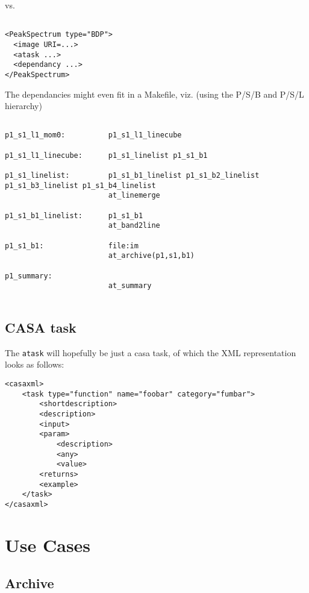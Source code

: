 \documentclass{report}
\begin{document}
vs.

\footnotesize
\begin{verbatim}

<PeakSpectrum type="BDP"> 
  <image URI=...> 
  <atask ...>
  <dependancy ...>
</PeakSpectrum>

\end{verbatim}
\normalsize



The dependancies might even fit in a Makefile, viz. (using the P/S/B and P/S/L hierarchy)


\footnotesize
\begin{verbatim}

p1_s1_l1_mom0:          p1_s1_l1_linecube

p1_s1_l1_linecube:      p1_s1_linelist p1_s1_b1

p1_s1_linelist:         p1_s1_b1_linelist p1_s1_b2_linelist p1_s1_b3_linelist p1_s1_b4_linelist
                        at_linemerge

p1_s1_b1_linelist:      p1_s1_b1
                        at_band2line

p1_s1_b1:               file:im
                        at_archive(p1,s1,b1)

p1_summary:
                        at_summary
        
\end{verbatim}
\normalsize


\subsection{CASA task}

The {\tt atask} will hopefully be just a casa task, of which the XML representation
looks as follows:
\footnotesize
\begin{verbatim}
<casaxml>
    <task type="function" name="foobar" category="fumbar">
        <shortdescription>
        <description>
        <input>
	    <param>
	        <description>
	        <any>
	        <value>
        <returns>
        <example>
    </task>  
</casaxml>
\end{verbatim}
\normalsize

\section{Use Cases}

\subsection{Archive}
\end{document}
